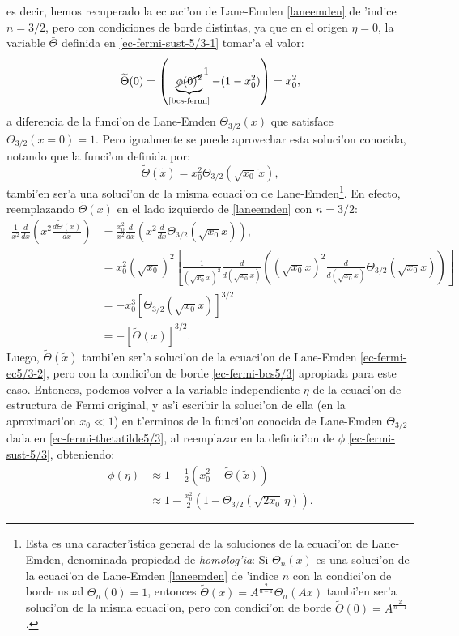 es decir, hemos recuperado la ecuaci'on de Lane-Emden  \eqref{laneemden} de 'indice $n=3/2$, pero con condiciones de borde distintas, ya que en el origen $\eta=0$, la variable $\bar{\Theta}$  definida en \eqref{ec-fermi-sust-5/3-1} tomar'a el valor:
\begin{align}\label{ec-fermi-bcs5/3}
 \widetilde{\Theta}(0)=\left(\underbrace{\cancelto{1}{\phi(0)}^2}_{\text{\eqref{bcs-fermi}}}-(1-x_0^2)\right)=x_0^2,
\end{align}
a diferencia de la funci'on de Lane-Emden $\Theta_{3/2}(x)$ que satisface $\Theta_{3/2}(x=0)=1$. Pero igualmente se puede aprovechar esta soluci'on conocida, notando que la funci'on definida por:
\begin{equation}\label{ec-fermi-thetatilde5/3}
 \widetilde{\Theta}(\widetilde{x})=x_0^2\Theta_{3/2}(\sqrt{x_0} \,\widetilde{x}),
\end{equation}
tambi'en ser'a una soluci'on de la misma ecuaci'on de Lane-Emden\footnote{Esta es una caracter'istica general de la soluciones de la ecuaci'on de Lane-Emden, denominada propiedad de \emph{homolog'ia}: Si $\Theta_n(x)$ es una soluci'on de la ecuaci'on de Lane-Emden \eqref{laneemden} de 'indice $n$ con la condici'on de borde usual $\Theta_n(0)=1$, entonces $\widetilde{\Theta}(x)=A^{\frac{2}{n-1}}\Theta_n(Ax)$ tambi'en ser'a soluci'on de la misma ecuaci'on, pero con condici'on de borde $\widetilde{\Theta}(0)=A^{\frac{2}{n-1}}$.}. En efecto, reemplazando $\widetilde{\Theta}(x)$ en el lado izquierdo de \eqref{laneemden} con $n=3/2$:
\begin{align} \frac{1}{x^2}\frac{d}{dx}\left(x^2\frac{d\widetilde{\Theta}(x)}{dx}\right)&=\frac{x_0^2}{x^2}\frac{d}{dx}\left(x^2\frac{d}{dx}\Theta_{3/2}(\sqrt{x_0}x)\right),\\
&=x_0^2(\sqrt{x_0})^2\left[\frac{1}{(\sqrt{x_0}x)^2}\frac{d}{d(\sqrt{x_0}x)}\left((\sqrt{x_0}x)^2\frac{d}{d(\sqrt{x_0}x)}\Theta_{3/2}(\sqrt{x_0}x)\right)\right]\\
&=-x_0^3\left[\Theta_{3/2}(\sqrt{x_0}x)\right]^{3/2}\\
&=-\left[\widetilde{\Theta}(x)\right]^{3/2}.
\end{align}
Luego, $\widetilde{\Theta}(\widetilde{x})$ tambi'en ser'a soluci'on de la ecuaci'on de Lane-Emden \eqref{ec-fermi-ec5/3-2}, pero con la condici'on de borde \eqref{ec-fermi-bcs5/3} apropiada para este caso. Entonces, podemos volver a la variable independiente $\eta$ de la ecuaci'on de estructura de Fermi original, y as'i escribir la soluci'on de ella (en la aproximaci'on $x_0\ll1$) en t'erminos de la funci'on conocida de Lane-Emden $\Theta_{3/2}$ dada en \eqref{ec-fermi-thetatilde5/3}, al reemplazar en la definici'on de $\phi$  \eqref{ec-fermi-sust-5/3}, obteniendo:
\begin{align}
 \phi(\eta)&\approx1-\frac{1}{2}\left(x_0^2-\widetilde{\Theta}(\widetilde{x})\right)\\
&\approx1-\frac{x_0^2}{2}\left(1-\Theta_{3/2}(\sqrt{2x_0} \,\eta)\right).\label{ec-fermi-phi5/3}
\end{align}

